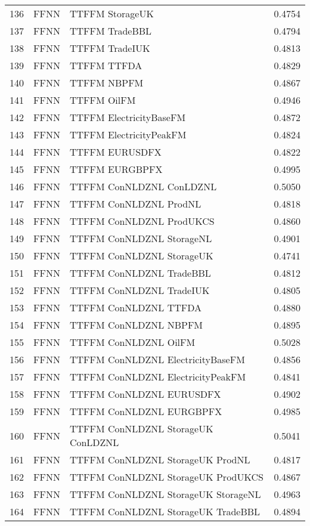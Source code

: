 \begin{table}[ht]
\begin{tabular}{rllr}
  136 & FFNN & TTFFM StorageUK & 0.4754 \\ 
  137 & FFNN & TTFFM TradeBBL & 0.4794 \\ 
  138 & FFNN & TTFFM TradeIUK & 0.4813 \\ 
  139 & FFNN & TTFFM TTFDA & 0.4829 \\ 
  140 & FFNN & TTFFM NBPFM & 0.4867 \\ 
  141 & FFNN & TTFFM OilFM & 0.4946 \\ 
  142 & FFNN & TTFFM ElectricityBaseFM & 0.4872 \\ 
  143 & FFNN & TTFFM ElectricityPeakFM & 0.4824 \\ 
  144 & FFNN & TTFFM EURUSDFX & 0.4822 \\ 
  145 & FFNN & TTFFM EURGBPFX & 0.4995 \\ 
  146 & FFNN & TTFFM ConNLDZNL ConLDZNL & 0.5050 \\ 
  147 & FFNN & TTFFM ConNLDZNL ProdNL & 0.4818 \\ 
  148 & FFNN & TTFFM ConNLDZNL ProdUKCS & 0.4860 \\ 
  149 & FFNN & TTFFM ConNLDZNL StorageNL & 0.4901 \\ 
  150 & FFNN & TTFFM ConNLDZNL StorageUK & 0.4741 \\ 
  151 & FFNN & TTFFM ConNLDZNL TradeBBL & 0.4812 \\ 
  152 & FFNN & TTFFM ConNLDZNL TradeIUK & 0.4805 \\ 
  153 & FFNN & TTFFM ConNLDZNL TTFDA & 0.4880 \\ 
  154 & FFNN & TTFFM ConNLDZNL NBPFM & 0.4895 \\ 
  155 & FFNN & TTFFM ConNLDZNL OilFM & 0.5028 \\ 
  156 & FFNN & TTFFM ConNLDZNL ElectricityBaseFM & 0.4856 \\ 
  157 & FFNN & TTFFM ConNLDZNL ElectricityPeakFM & 0.4841 \\ 
  158 & FFNN & TTFFM ConNLDZNL EURUSDFX & 0.4902 \\ 
  159 & FFNN & TTFFM ConNLDZNL EURGBPFX & 0.4985 \\ 
  160 & FFNN & TTFFM ConNLDZNL StorageUK ConLDZNL & 0.5041 \\ 
  161 & FFNN & TTFFM ConNLDZNL StorageUK ProdNL & 0.4817 \\ 
  162 & FFNN & TTFFM ConNLDZNL StorageUK ProdUKCS & 0.4867 \\ 
  163 & FFNN & TTFFM ConNLDZNL StorageUK StorageNL & 0.4963 \\ 
  164 & FFNN & TTFFM ConNLDZNL StorageUK TradeBBL & 0.4894 \\ 

\end{tabular}
\end{table}

